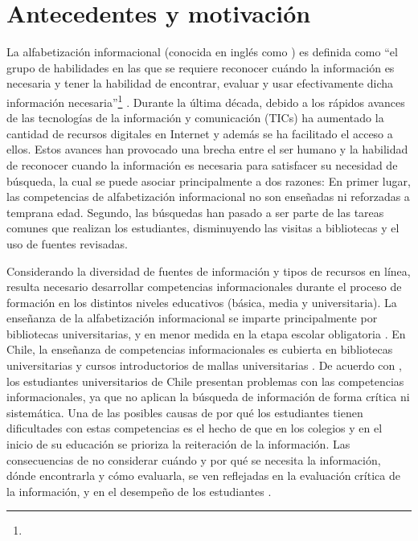 \section{Antecedentes y motivación}
\label{sec:antecedentes-motivacion}
La alfabetización informacional (conocida en inglés como ) es definida como “el grupo de habilidades en las que se requiere reconocer cuándo la información es necesaria y tener la habilidad de encontrar, evaluar y usar efectivamente dicha información necesaria”\footnote{\traduccionlibre} \parencite[p.~2]{american2000information}. Durante la última década, debido a los rápidos avances de las tecnologías de la información y comunicación (TICs) ha aumentado la cantidad de recursos digitales en Internet y además se ha facilitado el acceso a ellos. Estos avances han provocado una brecha entre el ser humano y la habilidad de reconocer cuando la información es necesaria para satisfacer su necesidad de búsqueda, la cual se puede asociar principalmente a dos razones: En primer lugar, las competencias de alfabetización informacional no son enseñadas ni reforzadas a temprana edad. Segundo, las búsquedas  han pasado a ser parte de las tareas comunes que realizan los estudiantes, disminuyendo las visitas a bibliotecas y el uso de fuentes revisadas.

Considerando la diversidad de fuentes de información y tipos de recursos en línea, resulta necesario desarrollar competencias informacionales durante el proceso de formación en los distintos niveles educativos (básica, media y universitaria). La enseñanza de la alfabetización informacional se imparte principalmente por bibliotecas universitarias, y en menor medida en la etapa escolar obligatoria \parencite{weiner2014teaches}. En Chile, la enseñanza de competencias informacionales es cubierta en bibliotecas universitarias y cursos introductorios de mallas universitarias \parencite{marzal2015diagnostico}. De acuerdo con \textcite{urra2016alfabetizacion}, los estudiantes universitarios de Chile presentan problemas con las competencias informacionales, ya que no aplican la búsqueda de información de forma crítica ni sistemática. Una de las posibles causas de por qué los estudiantes tienen dificultades con estas competencias es el hecho de que en los colegios y en el inicio de su educación se prioriza la reiteración de la información. Las consecuencias de no considerar cuándo y por qué se necesita la información, dónde encontrarla y cómo evaluarla, se ven reflejadas en la evaluación crítica de la información, y en el desempeño de los estudiantes \parencite{urra2016alfabetizacion}. 

